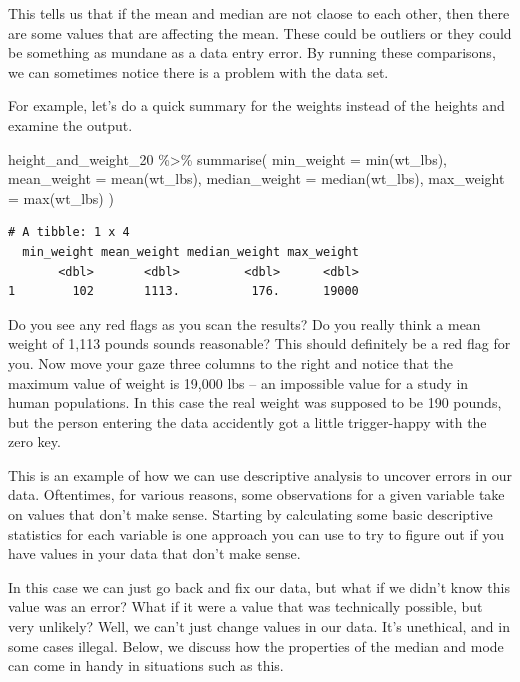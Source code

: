 \documentclass[
  letterpaper,
  DIV=11,
  numbers=noendperiod]{scrreprt}
\newenvironment{Shaded}{\begin{snugshade}}{\end{snugshade}}
\newcommand{\AttributeTok}[1]{\textcolor[rgb]{0.40,0.45,0.13}{#1}}
\newcommand{\FunctionTok}[1]{\textcolor[rgb]{0.28,0.35,0.67}{#1}}
\newcommand{\NormalTok}[1]{\textcolor[rgb]{0.00,0.23,0.31}{#1}}
\newcommand{\SpecialCharTok}[1]{\textcolor[rgb]{0.37,0.37,0.37}{#1}}
\begin{document}
This tells us that if the mean and median are not claose to each other,
then there are some values that are affecting the mean. These could be
outliers or they could be something as mundane as a data entry error. By
running these comparisons, we can sometimes notice there is a problem
with the data set.

For example, let's do a quick summary for the weights instead of the
heights and examine the output.

\begin{Shaded}
\begin{Highlighting}[]
\NormalTok{height\_and\_weight\_20 }\SpecialCharTok{\%\textgreater{}\%} 
  \FunctionTok{summarise}\NormalTok{(}
    \AttributeTok{min\_weight    =} \FunctionTok{min}\NormalTok{(wt\_lbs),}
    \AttributeTok{mean\_weight   =} \FunctionTok{mean}\NormalTok{(wt\_lbs),}
    \AttributeTok{median\_weight =} \FunctionTok{median}\NormalTok{(wt\_lbs),}
    \AttributeTok{max\_weight    =} \FunctionTok{max}\NormalTok{(wt\_lbs)}
\NormalTok{  )}
\end{Highlighting}
\end{Shaded}

\begin{verbatim}
# A tibble: 1 x 4
  min_weight mean_weight median_weight max_weight
       <dbl>       <dbl>         <dbl>      <dbl>
1        102       1113.          176.      19000
\end{verbatim}

Do you see any red flags as you scan the results? Do you really think a
mean weight of 1,113 pounds sounds reasonable? This should definitely be
a red flag for you. Now move your gaze three columns to the right and
notice that the maximum value of weight is 19,000 lbs -- an impossible
value for a study in human populations. In this case the real weight was
supposed to be 190 pounds, but the person entering the data accidently
got a little trigger-happy with the zero key.

This is an example of how we can use descriptive analysis to uncover
errors in our data. Oftentimes, for various reasons, some observations
for a given variable take on values that don't make sense. Starting by
calculating some basic descriptive statistics for each variable is one
approach you can use to try to figure out if you have values in your
data that don't make sense.

In this case we can just go back and fix our data, but what if we didn't
know this value was an error? What if it were a value that was
technically possible, but very unlikely? Well, we can't just change
values in our data. It's unethical, and in some cases illegal. Below, we
discuss how the properties of the median and mode can come in handy in
situations such as this.
\end{document}
